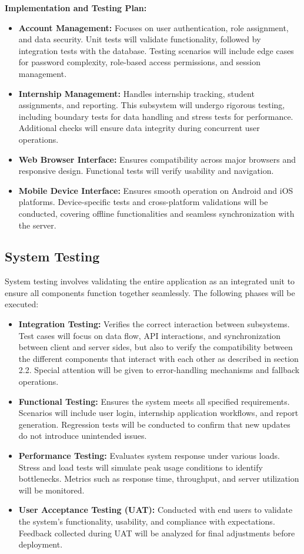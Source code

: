 \documentclass[11pt,twoside]{article}
\begin{document}
\textbf{Implementation and Testing Plan:}
\begin{itemize}
    \item \textbf{Account Management:} Focuses on user authentication, role assignment, and data security. Unit tests will validate functionality, followed by integration tests with the database. Testing scenarios will include edge cases for password complexity, role-based access permissions, and session management.
    \item \textbf{Internship Management:} Handles internship tracking, student assignments, and reporting. This subsystem will undergo rigorous testing, including boundary tests for data handling and stress tests for performance. Additional checks will ensure data integrity during concurrent user operations.
    \item \textbf{Web Browser Interface:} Ensures compatibility across major browsers and responsive design. Functional tests will verify usability and navigation.
    \item \textbf{Mobile Device Interface:} Ensures smooth operation on Android and iOS platforms. Device-specific tests and cross-platform validations will be conducted, covering offline functionalities and seamless synchronization with the server.
\end{itemize}

\subsection{System Testing}
System testing involves validating the entire application as an integrated unit to ensure all components function together seamlessly. The following phases will be executed:

\begin{itemize}
    \item \textbf{Integration Testing:} Verifies the correct interaction between subsystems. Test cases will focus on data flow, API interactions, and synchronization between client and server sides, but also to verify the compatibility between the different components that interact with each other as described in section 2.2. Special attention will be given to error-handling mechanisms and fallback operations.
    \item \textbf{Functional Testing:} Ensures the system meets all specified requirements. Scenarios will include user login, internship application workflows, and report generation. Regression tests will be conducted to confirm that new updates do not introduce unintended issues.
    \item \textbf{Performance Testing:} Evaluates system response under various loads. Stress and load tests will simulate peak usage conditions to identify bottlenecks. Metrics such as response time, throughput, and server utilization will be monitored.
    \item \textbf{User Acceptance Testing (UAT):} Conducted with end users to validate the system's functionality, usability, and compliance with expectations. Feedback collected during UAT will be analyzed for final adjustments before deployment.
\end{itemize}
\end{document}
